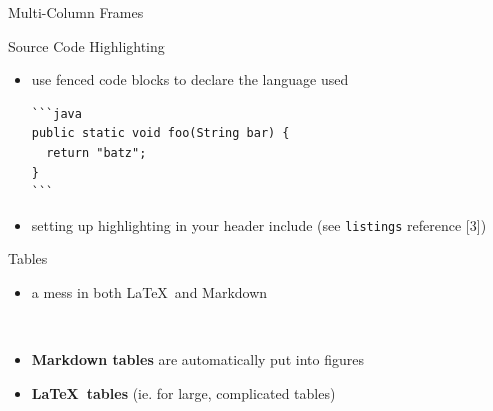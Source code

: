 \documentclass[smaller,ignorenonframetext,]{beamer}
\begin{document}
\begin{frame}{Multi-Column Frames}


\end{frame}

\begin{frame}[fragile]{Source Code Highlighting}

\begin{itemize}
\item
  use fenced code blocks to declare the language used

\begin{lstlisting}
```java
public static void foo(String bar) {
  return "batz";
}
```
\end{lstlisting}
\item
  setting up highlighting in your header include (see
  \lstinline!listings! reference {[}3{]})
\end{itemize}

\end{frame}

\begin{frame}[fragile]{Tables}

\begin{itemize}
\itemsep1pt\parskip0pt
\item
  a mess in both \LaTeX~and Markdown
\end{itemize}

~

\begin{itemize}
\itemsep1pt\parskip0pt
\item
  \textbf{Markdown tables} are automatically put into figures

\item
  \textbf{\LaTeX~tables} (ie. for large, complicated tables)
\end{itemize}

\end{frame}
\end{document}
